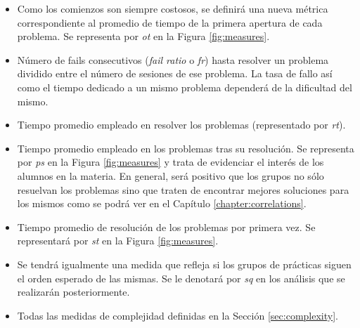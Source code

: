 \begin{itemize}
\item Como los comienzos son siempre costosos, se definirá una nueva métrica correspondiente al promedio de tiempo de la primera apertura de cada problema. Se representa por \emph{ot} en la Figura \ref{fig:measures}.
\item Número de fails consecutivos (\emph{fail ratio} o \emph{fr}) hasta resolver un problema dividido entre el número de sesiones de ese problema. La tasa de fallo así como el tiempo dedicado a un mismo problema dependerá de la dificultad del mismo.
\item Tiempo promedio empleado en resolver los problemas (representado por \emph{rt}).
\item Tiempo promedio empleado en los problemas tras su resolución. Se representa por \emph{ps} en la Figura \ref{fig:measures} y trata de evidenciar el interés de los alumnos en la materia. En general, será positivo que los grupos no sólo resuelvan los problemas sino que traten de encontrar mejores soluciones para los mismos como se podrá ver en el Capítulo \ref{chapter:correlations}.
\item Tiempo promedio de resolución de los problemas por primera vez. Se representará por \emph{st} en la Figura \ref{fig:measures}.
\item Se tendrá igualmente una medida que refleja si los grupos de prácticas siguen el orden esperado de las mismas. Se le denotará por \emph{sq} en los análisis que se realizarán posteriormente.
\item Todas las medidas de complejidad definidas en la Sección \ref{sec:complexity}.
\end{itemize}